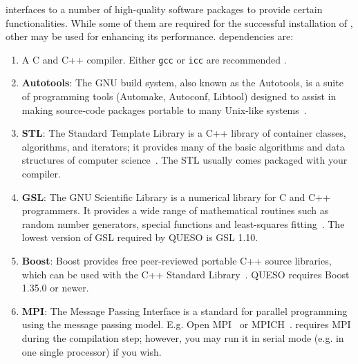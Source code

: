 \Queso{} interfaces to a number of high-quality software packages to provide certain functionalities. While some of them are required for the successful installation of \Queso{}, other may be used for enhancing its performance. 
%
\Queso{} dependencies are:
\begin{enumerate}%

  \item A C and C++ compiler. Either \texttt{gcc} or \texttt{icc} are recommended \cite{GCC,ICC}.
  
  \item \textbf{Autotools}: The GNU build system, also known as the Autotools, is a suite of programming tools (Automake, Autoconf, Libtool) designed to assist in making source-code packages portable to many Unix-like systems~\cite{Autotools}.
  
  \item \textbf{STL}: The Standard Template Library is a C++ library of container classes, algorithms, and iterators; it provides many of the basic algorithms and data structures of computer science~\cite{STL}. The STL usually comes packaged with your compiler.

  \item \textbf{GSL}: The GNU Scientific Library is a numerical library for C and C++ programmers. It provides a wide range of mathematical routines such as random number generators, special functions and least-squares fitting~\cite{Gsl}. The lowest version of GSL required by QUESO is GSL 1.10.

  \item \textbf{Boost}: Boost provides free peer-reviewed portable C++ source libraries, which can be used with the C++ Standard Library~\cite{Boost}. QUESO requires Boost 1.35.0 or newer.

  \item \textbf{MPI}: The Message Passing Interface is a standard for parallel programming using the message passing model. E.g. Open MPI~\cite{Openmpi} or MPICH~\cite{Mpich}. \Queso{} requires MPI during the compilation step; however, you may run it in serial mode (e.g. in one single processor) if you wish. %

\end{enumerate}%

% 



